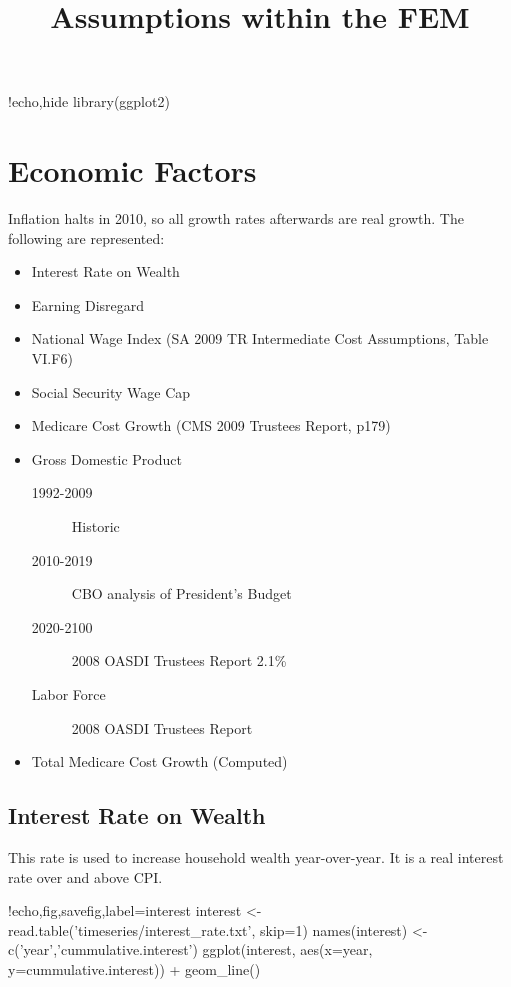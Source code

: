 \documentclass{article}
\title{Assumptions within the FEM}
\begin{document}
\maketitle

\begin{Rcode}{!echo,hide}
library(ggplot2)
\end{Rcode}

\section{Economic Factors}

Inflation halts in 2010, so all growth rates afterwards are real
growth.  The following are represented:
\begin{itemize}
\item Interest Rate on Wealth
\item Earning Disregard
\item National Wage Index (SA 2009 TR Intermediate Cost Assumptions,
  Table VI.F6)
\item Social Security Wage Cap
\item Medicare Cost Growth (CMS 2009 Trustees Report, p179)
\item Gross Domestic Product
\begin{description}
\item[1992-2009] Historic
\item[2010-2019] CBO analysis of President's Budget
\item[2020-2100] 2008 OASDI Trustees Report 2.1\%
\item[Labor Force] 2008 OASDI Trustees Report
\end{description}
\item Total Medicare Cost Growth (Computed)
\end{itemize}

\subsection{Interest Rate on Wealth}
This rate is used to increase household wealth year-over-year. It is a
real interest rate over and above CPI.

\begin{Rcode}{!echo,fig,savefig,label=interest}
interest <- read.table('timeseries/interest_rate.txt', skip=1)
names(interest) <- c('year','cummulative.interest')
ggplot(interest, aes(x=year, y=cummulative.interest)) + geom_line()
\end{Rcode}
\end{document}
